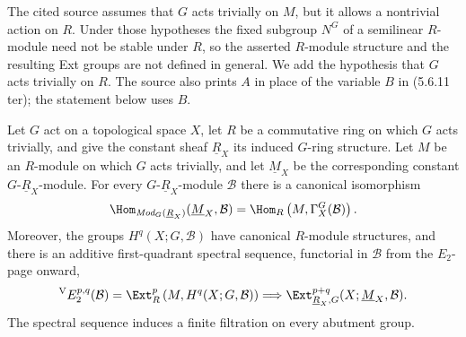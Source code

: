 \begin{lemma}
\label{lemma-equivariant-ext-trivial-action-spectral-sequence}
\begin{reference}
\cite[Chapter V, \S 5.6, formulas (5.6.5 ter) and (5.6.11 ter),
p. 218]{Tohoku}
\end{reference}
\begin{history}
The cited source assumes that $G$ acts trivially on $M$, but it allows a
nontrivial action on $R$. Under those hypotheses the fixed subgroup $N^G$
of a semilinear $R$-module need not be stable under $R$, so the asserted
$R$-module structure and the resulting Ext groups are not defined in
general. We add the hypothesis that $G$ acts trivially on $R$. The source
also prints $A$ in place of the variable $B$ in (5.6.11 ter); the statement
below uses $B$.
\end{history}
Let $G$ act on a topological space $X$, let $R$ be a commutative ring on
which $G$ acts trivially, and give the constant sheaf $\underline R_X$ its
induced $G$-ring structure. Let $M$ be an $R$-module on which $G$ acts
trivially, and let $\underline M_X$ be the corresponding constant
$G$-$\underline R_X$-module. For every $G$-$\underline R_X$-module
$\mathcal B$ there is a canonical isomorphism
$$
\Hom_{\textit{Mod}_G(\underline R_X)}
(\underline M_X,\mathcal B)
=
\Hom_R\left(M,\Gamma_X^G(\mathcal B)\right).
$$
Moreover, the groups $H^q(X;G,\mathcal B)$ have canonical $R$-module
structures, and there is an additive first-quadrant spectral sequence,
functorial in $\mathcal B$ from the $E_2$-page onward,
$$
{}^{\mathrm V}E_2^{p,q}(\mathcal B)
=
\Ext_R^p\left(M,H^q(X;G,\mathcal B)\right)
\Longrightarrow
\Ext_{\underline R_X,G}^{p+q}
(X;\underline M_X,\mathcal B).
$$
The spectral sequence induces a finite filtration on every abutment group.
\end{lemma}

